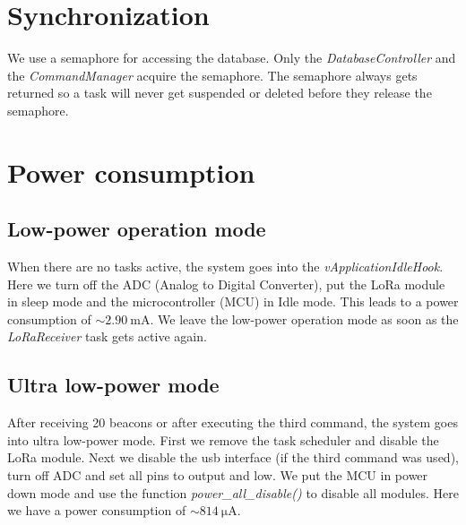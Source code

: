 \documentclass{scrartcl}
\begin{document}
\section{Synchronization}
We use a semaphore for accessing the database. Only the \textit{DatabaseController} and the \textit{CommandManager} acquire the semaphore.
The semaphore always gets returned so a task will never get suspended or deleted before they release the semaphore.

\newpage

\section{Power consumption}
\subsection{Low-power operation mode}
When there are no tasks active, the system goes into the \textit{vApplicationIdleHook}.
Here we turn off the ADC (Analog to Digital Converter),
put the LoRa module in sleep mode and the microcontroller (MCU) in Idle mode.
This leads to a power consumption of $\sim \SI{2.90}{\milli\ampere}$.
We leave the low-power operation mode as soon as the \textit{LoRaReceiver} task gets active again.

\subsection{Ultra low-power mode}
After receiving 20 beacons or after executing the third command, the system goes into ultra low-power mode.
First we remove the task scheduler and disable the LoRa module.
Next we disable the usb interface (if the third command was used), turn off ADC and set all pins to output and low.
We put the MCU in power down mode and use the function \textit{power\_all\_disable()} to disable all modules.
Here we have a power consumption of $\sim \SI{814}{\micro\ampere}$.
\end{document}
